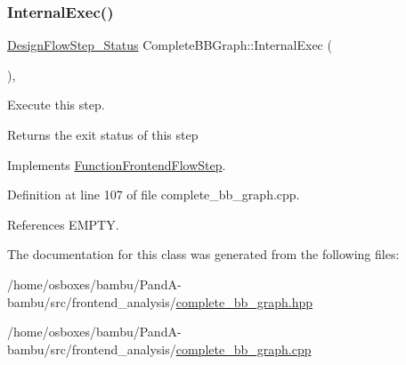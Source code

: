 \mbox{\label{classCompleteBBGraph_a0c40c1a3925b328227433d1bb74458ed}} 
\subsubsection{\texorpdfstring{Internal\+Exec()}{InternalExec()}}
{\footnotesize\ttfamily \hyperlink{design__flow__step_8hpp_afb1f0d73069c26076b8d31dbc8ebecdf}{Design\+Flow\+Step\+\_\+\+Status} Complete\+B\+B\+Graph\+::\+Internal\+Exec (\begin{DoxyParamCaption}{ }\end{DoxyParamCaption})\hspace{0.3cm}{\ttfamily [override]}, {\ttfamily [virtual]}}



Execute this step. 

\begin{DoxyReturn}{Returns}
the exit status of this step 
\end{DoxyReturn}


Implements \hyperlink{classFunctionFrontendFlowStep_a00612f7fb9eabbbc8ee7e39d34e5ac68}{Function\+Frontend\+Flow\+Step}.



Definition at line 107 of file complete\+\_\+bb\+\_\+graph.\+cpp.



References E\+M\+P\+TY.



The documentation for this class was generated from the following files\+:\begin{DoxyCompactItemize}
\item 
/home/osboxes/bambu/\+Pand\+A-\/bambu/src/frontend\+\_\+analysis/\hyperlink{complete__bb__graph_8hpp}{complete\+\_\+bb\+\_\+graph.\+hpp}\item 
/home/osboxes/bambu/\+Pand\+A-\/bambu/src/frontend\+\_\+analysis/\hyperlink{complete__bb__graph_8cpp}{complete\+\_\+bb\+\_\+graph.\+cpp}\end{DoxyCompactItemize}
